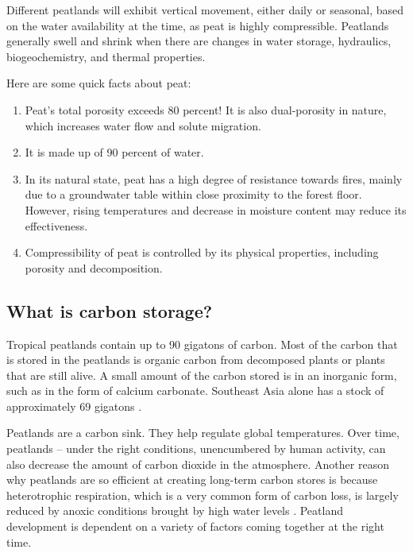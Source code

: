 Different peatlands will exhibit vertical movement, either daily or seasonal, based on the water availability at the time, as peat is highly compressible. Peatlands generally swell and shrink when there are changes in water storage, hydraulics, biogeochemistry, and thermal properties. 

Here are some quick facts about peat:
\begin{enumerate}

\item Peat's total porosity exceeds 80 percent! It is also dual-porosity in nature, which increases water flow and solute migration.

\item It is made up of 90 percent of water.

\item In its natural state, peat has a high degree of resistance towards fires, mainly due to a groundwater table within close proximity to the forest floor. However, rising temperatures and decrease in moisture content may reduce its effectiveness.

  \item Compressibility of peat is controlled by its physical properties, including porosity and decomposition. 
  
\end{enumerate}

\subsection{What is carbon storage?}

Tropical peatlands contain up to 90 gigatons of carbon. Most of the carbon that is stored in the peatlands is organic carbon from decomposed plants or plants that are still alive. A small amount of the carbon stored is in an inorganic form, such as in the form of calcium carbonate. Southeast Asia alone has a stock of approximately 69 gigatons \citep{page2016line}. 

Peatlands are a carbon sink. They help regulate global temperatures. Over time, peatlands -- under the right conditions, unencumbered by human activity, can also decrease the amount of carbon dioxide in the atmosphere. Another reason why peatlands are so efficient at creating long-term carbon stores is because heterotrophic respiration, which is a very common form of carbon loss, is largely reduced by anoxic conditions brought by high water levels \citep{hirano2009controls}. Peatland development is dependent on a variety of factors coming together at the right time.

